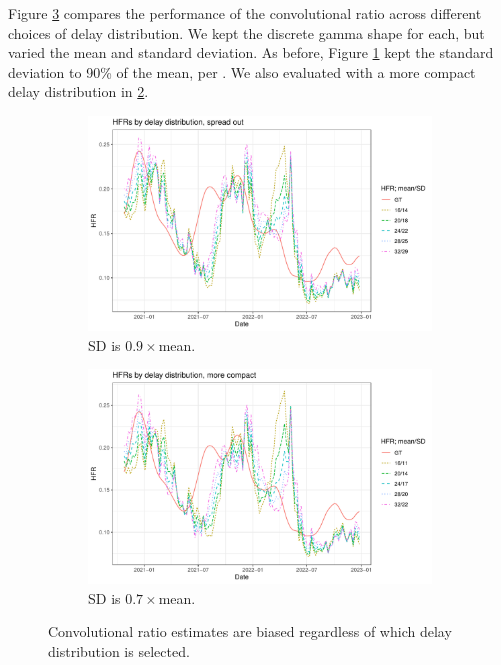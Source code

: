 \documentclass{article}
\begin{document}
Figure \ref{fig:delays} compares the performance of the convolutional ratio across different choices of delay distribution. We kept the discrete gamma shape for each, but varied the mean and standard deviation. As before, Figure \ref{fig:delay1} kept the standard deviation to 90\% of the mean, per \citet{UKdelay}. We also evaluated with a more compact delay distribution in \ref{fig:delay2}. 


\begin{figure}
     \centering
     \begin{subfigure}[b]{0.45\linewidth}
         \centering
         \includegraphics[width=\linewidth]{Figs/Real/hfrs_by_delay1.pdf}
         \caption{SD is $0.9\times$mean.}
         \label{fig:delay1}
     \end{subfigure}
     \hfill
     \begin{subfigure}[b]{0.45\linewidth}
         \centering
         \includegraphics[width=\linewidth]{Figs/Real/hfrs_by_delay2.pdf}
         \caption{SD is $0.7\times$mean.}
         \label{fig:delay2}
     \end{subfigure}
        \caption{Convolutional ratio estimates are biased regardless of which delay distribution is selected.}
        \label{fig:delays}
\end{figure}
\end{document}
